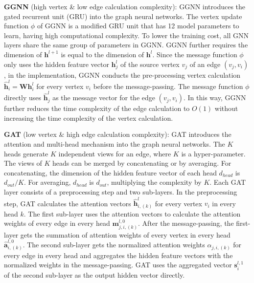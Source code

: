\textbf{GGNN} (high vertex \& low edge calculation complexity):
GGNN introduces the gated recurrent unit (GRU) into the graph neural networks.
The vertex update function $\phi$ of GGNN is a modified GRU unit that has 12 model parameters to learn, having high computational complexity.
To lower the training cost, all GNN layers share the same group of parameters in GGNN.
GGNN further requires the dimension of $\boldsymbol{h}^{l+1}$ is equal to the dimension of $\boldsymbol{h}^l$.
Since the message function $\phi$ only uses the hidden feature vector $\boldsymbol{h}^l_j$ of the source vertex $v_j$ of an edge $(v_j, v_i)$, in the implementation, GGNN conducts the pre-processing vertex calculation $\hat{\boldsymbol{h}}^l_i=\boldsymbol{W}\boldsymbol{h}^l_i$ for every vertex $v_i$ before the message-passing.
The message function $\phi$ directly uses $\hat{\boldsymbol{h}}^l_j$ as the message vector for the edge $(v_j, v_i)$.
In this way, GGNN further reduces the time complexity of the edge calculation to $O(1)$ without increasing the time complexity of the vertex calculation.

\textbf{GAT} (low vertex \& high edge calculation complexity):
GAT introduces the attention and multi-head mechanism into the graph neural networks.
The $K$ heads generate $K$ independent views for an edge, where $K$ is a hyper-parameter.
The views of $K$ heads can be merged by concatenating or by averaging.
For concatenating, the dimension of the hidden feature vector of each head $d_{head}$ is $d_{out}/K$.
For averaging, $d_{head}$ is $d_{out}$, multiplying the complexity by $K$.
Each GAT layer consists of a preprocessing step and two sub-layers.
In the preprocessing step, GAT calculates the attention vectors $\hat{\boldsymbol{h}}^{l}_{i,(k)}$ for every vertex $v_i$ in every head $k$.
The first sub-layer uses the attention vectors to calculate the attention weights of every edge in every head $\boldsymbol{m}^{l,0}_{j,i,(k)}$.
After the message-passing, the first-layer gets the summation of attention weights of every vertex in every head $\hat{\boldsymbol{a}}^{l,0}_{i,(k)}$.
The second sub-layer gets the normalized attention weights $\alpha_{j, i, (k)}$ for every edge in every head and aggregates the hidden feature vectors with the normalized weights in the message-passing.
GAT uses the aggregated vector $\boldsymbol{s}^{l,1}_i$ of the second sub-layer as the output hidden vector directly.

